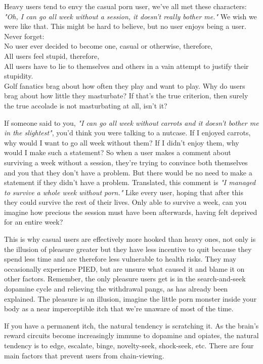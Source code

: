 \documentclass[easypeasy]{subfiles}
\begin{document}
Heavy users tend to envy the casual porn user, we've all met these characters: \textit{"Oh, I can go all week without a session, it doesn't really bother me."} We wish we were like that. This might be hard to believe, but no user enjoys being a user. Never forget:\\

      No user ever decided to become one, casual or otherwise, therefore, \\
      All users feel stupid, therefore, \\
      All users have to lie to themselves and others in a vain attempt to justify their stupidity. \\

Golf fanatics brag about how often they play and want to play. Why do users brag about how little they masturbate? If that's the true criterion, then surely the true accolade is not masturbating at all, isn't it?

If someone said to you, \textit{"I can go all week without carrots and it doesn't bother me in the slightest"}, you'd think you were talking to a nutcase. If I enjoyed carrots, why would I want to go all week without them? If I didn't enjoy them, why would I make such a statement? So when a user makes a comment about surviving a week without a session, they're trying to convince both themselves and you that they don't have a problem. But there would be no need to make a statement if they didn't have a problem. Translated, this comment is \textit{"I managed to survive a whole week without porn."} Like every user, hoping that after this they could survive the rest of their lives. Only able to survive a week, can you imagine how precious the session must have been afterwards, having felt deprived for an entire week?

This is why casual users are effectively more hooked than heavy ones, not only is the illusion of pleasure greater but they have less incentive to quit because they spend less time and are therefore less vulnerable to health risks. They may occasionally experience PIED, but are unsure what caused it and blame it on other factors. Remember, the only pleasure users get is in the search-and-seek dopamine cycle and relieving the withdrawal pangs, as has already been explained. The pleasure is an illusion, imagine the little porn monster inside your body as a near imperceptible itch that we're unaware of most of the time.

If you have a permanent itch, the natural tendency is scratching it. As the brain's reward circuits become increasingly immune to dopamine and opiates, the natural tendency is to edge, escalate, binge, novelty-seek, shock-seek, etc. There are four main factors that prevent users from chain-viewing.
\end{document}
